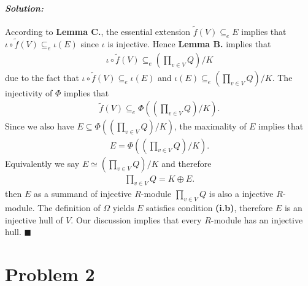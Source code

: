 \documentclass[12pt, a4paper]{article}
\theoremstyle{remark}
\newenvironment{solution}
  {\paragraph{\textit{Solution:}}\par\medskip}
  {\hfill$\blacksquare$\vspace{0.1cm}}
\begin{document}
\begin{solution}
    According to \textbf{Lemma C.}, the essential extension $\tilde{f}(V)\subseteq_e E$ implies that $\iota\circ\tilde{f}(V)\subseteq_e \iota(E)$ since $\iota$ is injective.
    Hence \textbf{Lemma B.} implies that
    \begin{align*}
        \iota\circ\tilde{f}(V)\subseteq_e (\prod_{v\in V} Q)/K
    \end{align*}
    due to the fact that $\iota\circ\tilde{f}(V)\subseteq_e \iota(E)$ and $\iota(E)\subseteq_e (\prod_{v\in V} Q)/K$.
    The injectivity of $\Phi$ implies that 
    \begin{align*}
        \tilde{f}(V)\subseteq_e \Phi\left((\prod_{v\in V} Q)/K\right).
    \end{align*}
    Since we also have $E\subseteq \Phi\left((\prod_{v\in V} Q)/K\right)$,
    the maximality of $E$ implies that 
    \begin{align*}
        E =  \Phi\left((\prod_{v\in V} Q)/K\right).
    \end{align*}
    Equivalently we say $E \simeq (\prod_{v\in V} Q)/K$ and therefore 
    \begin{align*}
        \prod_{v\in V} Q=K\oplus E.
    \end{align*}
    then $E$ as a summand of injective $R$-module $\prod_{v\in V} Q$ is also a injective $R$-module.
    The definition of $\Omega$ yields $E$ satisfies condition \textbf{(i.b)}, therefore $E$ is an injective hull of $V$.
    Our discussion implies that every $R$-module has an injective hull.
\end{solution} 


\section*{Problem 2}
\end{document}
